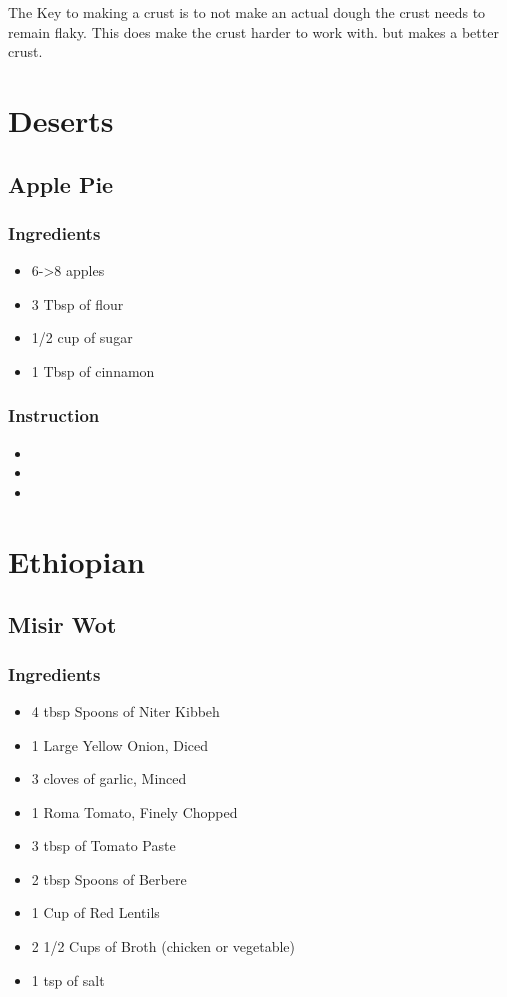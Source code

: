 \documentclass[11pt]{article}
\begin{document}
The Key to making a crust is to not make an actual dough the crust needs to remain flaky.
This does make the crust harder to work with. but makes a better crust.
\section{Deserts}
\label{sec:orgff2ecd4}
\subsection{Apple Pie}
\label{sec:org19df8d4}
\subsubsection*{Ingredients}
\label{sec:org3190a8f}
\begin{itemize}
\item 6->8 apples
\item 3 Tbsp of flour
\item 1/2 cup of sugar
\item 1 Tbsp of cinnamon
\end{itemize}
\subsubsection*{Instruction}
\label{sec:orgf3f5cca}
\begin{itemize}
\item 

\item 

\item 
\end{itemize}
\section{Ethiopian}
\label{sec:orge527725}
\subsection{Misir Wot}
\label{sec:orgc6e5a3a}
\subsubsection*{Ingredients}
\label{sec:org616fabd}
\begin{itemize}
\item 4 tbsp Spoons of Niter Kibbeh
\item 1 Large Yellow Onion, Diced
\item 3 cloves of garlic, Minced
\item 1 Roma Tomato, Finely Chopped
\item 3 tbsp of Tomato Paste
\item 2 tbsp Spoons of Berbere
\item 1 Cup of Red Lentils
\item 2 1/2 Cups of Broth (chicken or vegetable)
\item 1 tsp of salt
\end{itemize}
\end{document}
